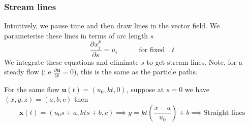\documentclass[11pt]{article}
\newcommand*{\pd}[3][]{\ensuremath{\frac{\partial^{#1} {#2}}{\partial {#3}^{#1}}}}
\newcommand{\mv}[1]{\textbf{#1}}
\newenvironment{eg}
    {\begin{mdframed}[backgroundcolor=mylg, roundcorner=5pt, linewidth=0pt]}
    {\end{mdframed}}
\begin{document}
\subsubsection{Stream lines}
Intuitively, we pause time and then draw lines in the vector field. We parameterise these lines in terms of arc length $s$
$$\pd{x_i^p}{s}=u_i \quad\quad\quad \text{for fixed} \quad t$$
We integrate these equations and eliminate $s$ to get stream lines. Note, for a steady flow (i.e $\pd{\mv{u}}{t}=0$), this is the same as the particle paths. 
\begin{eg}
For the same flow $\mv{u}(t)=(u_0,kt,0)$, suppose at $s=0$ we have $(x,y,z)=(a,b,c)$ then
$$\mv{x}(t)=(u_0s+a,kts+b,c)\implies y=kt\left(\frac{x-a}{u_0}\right)+b\implies\text{Straight lines}$$
\end{eg}
\end{document}
